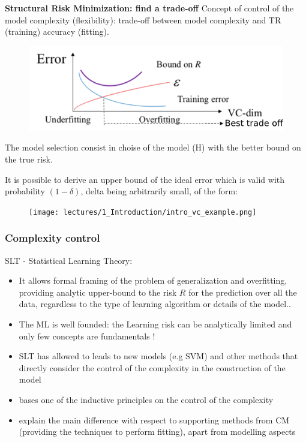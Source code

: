\documentclass[../main.tex]{subfiles}
\begin{document}
\noindent\textbf{Structural Risk Minimization: find a trade-off}
Concept of control of the model complexity (flexibility): trade-off between model complexity and TR (training) accuracy (fitting).
\begin{figure}[H]
    \centering
    \includegraphics[scale = 0.4]{lectures/1_Introduction/intro_struct_risk.png}
\end{figure}

\begin{definition}
The model selection consist in choise of the model (H) with the better bound on the true risk.
\end{definition}
\begin{example}
It is possible to derive an upper bound of the ideal error which is valid with probability $(1-\delta)$, delta being arbitrarily small, of the form:
\end{example}

\begin{figure}[ht]
    \centering
    \texttt{[image: lectures/1\_Introduction/intro\_vc\_example.png]}
\end{figure}

\subsubsection{Complexity control}
SLT - Statistical Learning Theory:
\begin{itemize}
    \item It allows formal framing of the problem of generalization and overfitting, providing analytic upper-bound to the risk $R$ for the prediction over all the data, regardless to the type of learning algorithm or details of the model..
    
    \item The ML is well founded: the Learning risk can be analytically limited and only few concepts are fundamentals !
    
    \item SLT has allowed to leads to new models (e.g SVM) and other methods that directly consider the control of the complexity in the construction of the model
    
    \item bases one of the inductive principles on the control of the complexity
    
    \item explain the main difference with respect to supporting methods from CM (providing
the techniques to perform fitting), apart from modelling aspects
\end{itemize}
\end{document}
